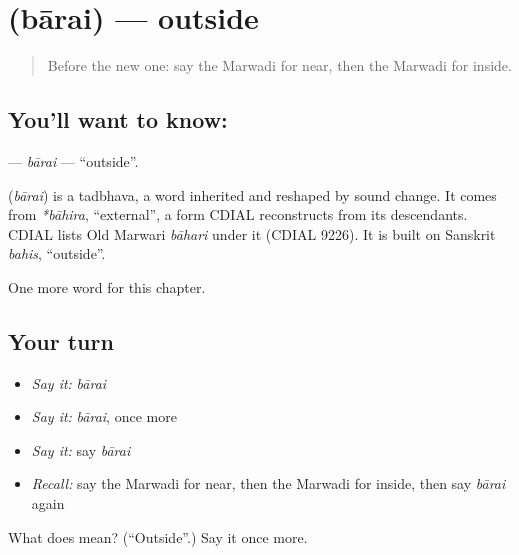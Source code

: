 \section[\texorpdfstring{\mw{बारै} (bārai)}{बारै (bārai)}]{ (bārai) — outside}

\label{lesson:MW-C81-barai}



\begin{quote}
Before the new one: say the Marwadi for near, then the Marwadi for inside.
\end{quote}

\subsection*{You'll want to know: }
\textbf{} — \emph{bārai} — \textquotedblleft{}outside\textquotedblright{}.

\begin{cousinweb}
\textbf{} (\emph{bārai}) is a tadbhava, a word inherited and reshaped by sound change. It comes from \emph{*bāhira}, \textquotedblleft{}external\textquotedblright{}, a form CDIAL reconstructs from its descendants. CDIAL lists Old Marwari \emph{bāhari} under it (CDIAL 9226). It is built on Sanskrit \emph{bahis}, \textquotedblleft{}outside\textquotedblright{}.
\end{cousinweb}

\begin{grammarlens}[title={What you've built}]
One more word for this chapter.
\end{grammarlens}

\subsection*{Your turn}
\begin{itemize}
\raggedright
  \item \emph{Say it:} \emph{bārai}
  \item \emph{Say it:} \emph{bārai}, once more
  \item \emph{Say it:} say \emph{bārai}
  \item \emph{Recall:} say the Marwadi for near, then the Marwadi for inside, then say \emph{bārai} again
\end{itemize}

\begin{tcolorbox}[breakable,colback=teal!4,colframe=teal!35!black,title={Before you move on}]
What does  mean? (\textquotedblleft{}Outside\textquotedblright{}.) Say it once more.
\end{tcolorbox}
